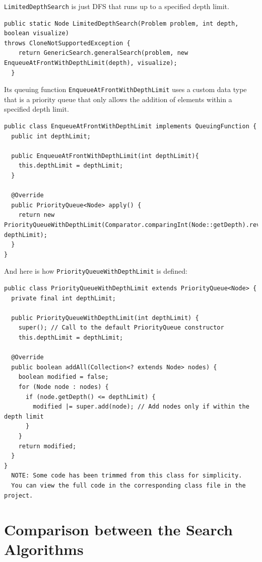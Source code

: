 \documentclass{article}
\begin{document}
\texttt{LimitedDepthSearch} is just DFS that runs up to a specified depth limit. 

\begin{verbatim}
public static Node LimitedDepthSearch(Problem problem, int depth, boolean visualize) 
throws CloneNotSupportedException {
    return GenericSearch.generalSearch(problem, new EnqueueAtFrontWithDepthLimit(depth), visualize);
  }
\end{verbatim}

Its queuing function \texttt{EnqueueAtFrontWithDepthLimit} uses a custom data type that is a priority queue that only allows the addition of elements within a specified depth limit.

\newpage

\begin{verbatim}
public class EnqueueAtFrontWithDepthLimit implements QueuingFunction {
  public int depthLimit;

  public EnqueueAtFrontWithDepthLimit(int depthLimit){
    this.depthLimit = depthLimit;
  }

  @Override
  public PriorityQueue<Node> apply() {
    return new PriorityQueueWithDepthLimit(Comparator.comparingInt(Node::getDepth).reversed(), depthLimit);
  }
}

\end{verbatim}

And here is how \texttt{PriorityQueueWithDepthLimit} is defined:

\begin{verbatim}
public class PriorityQueueWithDepthLimit extends PriorityQueue<Node> {
  private final int depthLimit;

  public PriorityQueueWithDepthLimit(int depthLimit) {
    super(); // Call to the default PriorityQueue constructor
    this.depthLimit = depthLimit;

  @Override
  public boolean addAll(Collection<? extends Node> nodes) {
    boolean modified = false;
    for (Node node : nodes) {
      if (node.getDepth() <= depthLimit) {
        modified |= super.add(node); // Add nodes only if within the depth limit
      }
    }
    return modified;
  }
}
  NOTE: Some code has been trimmed from this class for simplicity. 
  You can view the full code in the corresponding class file in the project.
\end{verbatim}

\newpage

\section{Comparison between the Search Algorithms}
\end{document}
